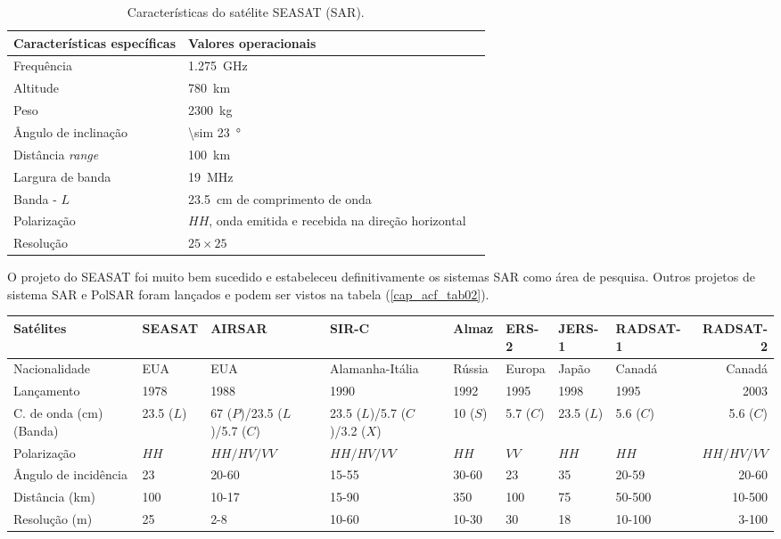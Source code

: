 \begin{table}[hbt]
	\centering
	\caption{Características do satélite SEASAT (SAR).}\label{cap_acf_tab01}
\begin{tabular}{@{}llr@{}} \toprule
	Características específicas& Valores operacionais  \\ \midrule
	Frequência           & \SI{1.275}{\GHz}  \\ 
	Altitude             & \SI{780}{\km}   \\
	Peso                 & \SI{2300}{\kilogram}   \\
	Ângulo de inclinação & \SI{\sim 23}{\degree}   \\
	Distância {\it range}& \SI{100}{\km}  \\
	Largura de banda     & \SI{19}{\MHz}   \\
	Banda - $L$          & \SI{23.5}{\cm} de comprimento de onda\\
	Polarização          & $HH$, onda emitida e recebida na direção horizontal \\
	Resolução            & $25 \times 25$  \\ \bottomrule

\end{tabular}
\end{table}
  
O projeto do SEASAT foi muito bem sucedido e estabeleceu definitivamente os sistemas SAR como área de pesquisa. Outros projetos de sistema SAR e PolSAR foram lançados e podem ser vistos na tabela (\ref{cap_acf_tab02}).

\begin{sidewaystable}
	\centering
	\caption{Características operacionais dos satélites SAR ou PolSAR.}\label{cap_acf_tab02}
\begin{tabular}{@{}llllllllr@{}} \toprule
Satélites      & 	SEASAT  &AIRSAR &SIR-C& Almaz&ERS-2& JERS-1& RADSAT-1&RADSAT-2 \\ \midrule
Nacionalidade       &EUA    &EUA&Alamanha-Itália&Rússia&Europa&Japão&Canadá&Canadá  \\ 
Lançamento          &1978   &1988        &1990  &1992  &1995 &1998  &1995  & 2003\\
C. de onda (\si{\cm}) (Banda) & 23.5 ($L$)&67 ($P$)/23.5 ($L$)/5.7 ($C$)&23.5 ($L$)/5.7 ($C$)/3.2 ($X$)&10 ($S$)&5.7 ($C$)&23.5 ($L$)&5.6 ($C$)&5.6 ($C$)\\
Polarização         &$HH$&$HH/HV/VV$&$HH/HV/VV$&$HH$&$VV$&$HH$&$HH$&$HH/HV/VV$\\
Ângulo de incidência&23&20-60&15-55&30-60&23&35&20-59&20-60\\
Distância (\si{\km})           &100&10-17&15-90&350&100&75&50-500&10-500\\
Resolução (\si{\m})         &25&2-8&10-60&10-30&30&18&10-100&3-100\\ \bottomrule
\end{tabular}
\end{sidewaystable}

